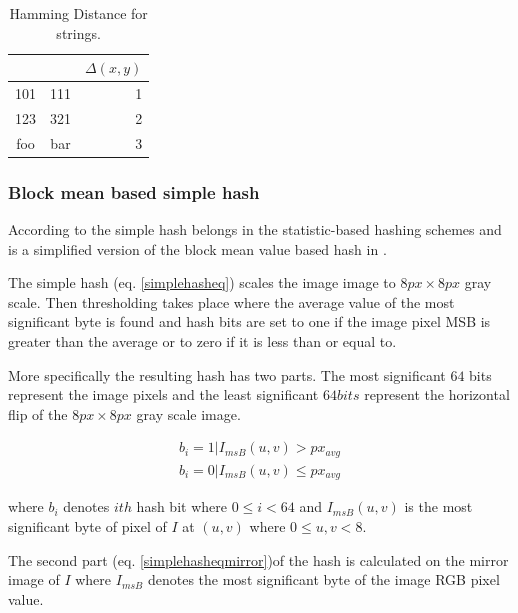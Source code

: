 \documentclass[english,12pt,a4paper,pdftex,elec,utf8, table]{aaltothesis}
\begin{document}
\begin{table}[htb]
\caption{Hamming Distance for strings.}
\label{hammingexamples}
\begin{center}
  \begin{tabular}{ccr}
&&$\Delta(x,y)$\\
    \hline \hline
    101 & 111 & 1\\
    \hline
    123 & 321 & 2\\
    \hline
    foo & bar & 3\\
    \hline
\end{tabular}
\end{center}\end{table}

\subsubsection{Block mean based simple hash}\label{simplehash}
According to \cite[p. 20]{Hadmi2012} the simple hash belongs in the statistic-based hashing schemes and is a simplified version of the block mean value based hash in \cite{Yang2006}.

The simple hash (eq. \ref{simplehasheq}) scales the image image to $8px \times 8px$ gray scale. Then thresholding takes place where the average value of the most significant byte is found and hash bits are set to one if the image pixel MSB is greater than the average or to zero if it is less than or equal to.

More specifically the resulting hash has two parts. The most significant $64$ bits represent the image pixels and the least significant $64bits$ represent the horizontal flip of the $8px \times 8px$ gray scale image.

\begin{equation} \label{simplehasheq}
  \begin{split}
  b_{i} = 1 | I_{msB}(u,v) > px_{avg}\\
  b_{i} = 0 | I_{msB}(u,v) \leq px_{avg}
  \end{split}
\end{equation}

where $b_{i}$ denotes $ith$ hash bit where $0 \leq i < 64$ and $I_{msB}(u,v)$ is the most significant byte of pixel of $I$ at $(u,v)$ where $0 \leq u,v < 8$.

The second part (eq. \ref{simplehasheqmirror})of the hash is calculated on the mirror image of $I$ where $I_{msB}$ denotes the most significant byte of the image RGB pixel value.
\end{document}
